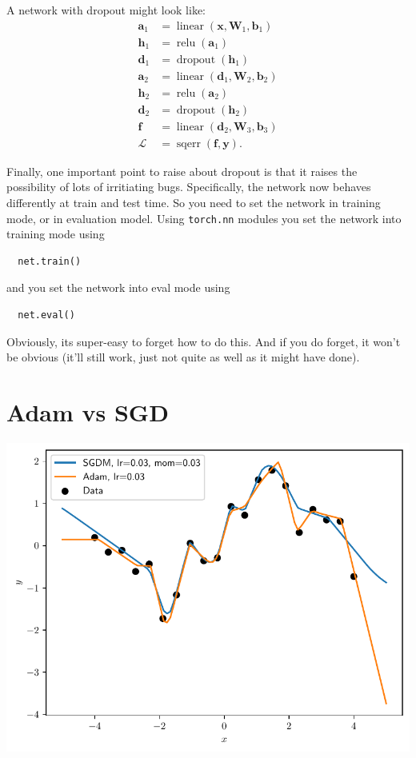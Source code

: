 \documentclass{article}
\newcommand{\bracket}[3]{\left#1 #3 \right#2}
\renewcommand{\b}{\bracket{(}{)}}
\newcommand{\0}{\mathbf{0}}
\newcommand{\x}{\mathbf{x}}
\newcommand{\y}{\mathbf{y}}
\newcommand{\f}{\mathbf{f}}
\newcommand{\h}{\mathbf{h}}
\renewcommand{\d}{\mathbf{d}}
\newcommand{\bv}{\mathbf{b}}
\renewcommand{\a}{\mathbf{a}}
\newcommand{\W}{\mathbf{W}}
\renewcommand{\L}{\mathcal{L}}
\newcommand{\linear}{\operatorname{linear}}
\newcommand{\relu}{\operatorname{relu}}
\newcommand{\sqerr}{\operatorname{sqerr}}
\newcommand{\dropout}{\operatorname{dropout}}
\begin{document}
A network with dropout might look like:
\begin{subequations}
\label{eq:forward}
\begin{align}
  \a_1 &= \linear\b{\x, \W_1, \bv_1}\\
  \h_1 &= \relu\b{\a_1}\\
  \d_1 &= \dropout\b{\h_1}\\
  \a_2 &= \linear\b{\d_1, \W_2, \bv_2}\\
  \h_2 &= \relu\b{\a_2}\\
  \d_2 &= \dropout\b{\h_2}\\
  \f &= \linear\b{\d_2, \W_3, \bv_3}\\
  \label{eq:L}
  \L &= \sqerr\b{\f, \y}.
\end{align}
\end{subequations}

Finally, one important point to raise about dropout is that it raises the possibility of lots of irritiating bugs.
Specifically, the network now behaves differently at train and test time.
So you need to set the network in training mode, or in evaluation model.
Using \verb|torch.nn| modules you set the network into training mode using
\begin{verbatim}
  net.train()
\end{verbatim}
and you set the network into eval mode using 
\begin{verbatim}
  net.eval()
\end{verbatim}
Obviously, its super-easy to forget how to do this.  And if you do forget, it won't be obvious (it'll still work, just not quite as well as it might have done).



\newpage
\section{Adam vs SGD}

\includegraphics[width=\textwidth]{adam_vs_sgd.pdf}
\end{document}
